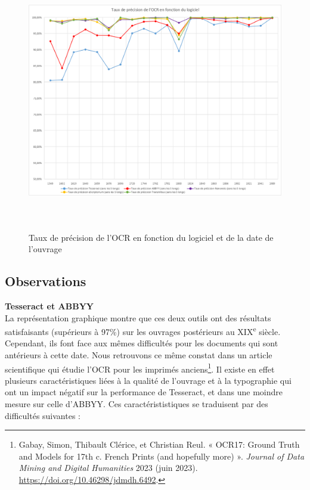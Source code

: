 \documentclass[a4paper,12pt,twoside]{book}
\begin{document}
	\begin{figure} [H]
		\includegraphics[width=6.15625in,height=4.5in]{vertopal_157ae480aa4a4b07be198b586a812241/media/image13.png}
		\caption{Taux de précision de l'OCR en fonction du logiciel et de la
			date de l'ouvrage}
	\end{figure}
	
	\subsection{Observations}
	
	\textbf{Tesseract et ABBYY} \\

La représentation graphique montre que ces deux outils ont des résultats
satisfaisants (supérieurs à 97\%) sur les ouvrages postérieurs au
XIX\textsuperscript{e} siècle. Cependant, ils font face aux mêmes
difficultés pour les documents qui sont antérieurs à cette date. Nous
retrouvons ce même constat dans un article scientifique qui étudie l'OCR
pour les imprimés anciens\footnote{Gabay, Simon, Thibault Clérice, et
	Christian Reul. « OCR17: Ground Truth and Models for 17th c. French
	Prints (and hopefully more) ». \emph{Journal of Data Mining and
		Digital Humanities} 2023 (juin 2023).
	\url{https://doi.org/10.46298/jdmdh.6492}.}.
Il existe en effet plusieurs caractéristiques liées à la qualité de
l'ouvrage et à la typographie qui ont un impact négatif sur la
performance de Tesseract, et dans une moindre mesure sur celle d'ABBYY.
Ces caractérististiques se traduisent par des difficultés suivantes : \\
\end{document}

